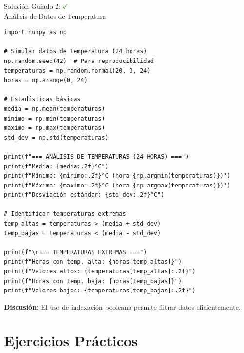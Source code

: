 \documentclass[10pt]{beamer}
\begin{document}
\begin{solutionblock}
\begin{frame}[fragile]{Solución Guiado 2: \hfill \textcolor{green}{$\checkmark$} \\ Análisis de Datos de Temperatura}
\begin{verbatim}
import numpy as np

# Simular datos de temperatura (24 horas)
np.random.seed(42)  # Para reproducibilidad
temperaturas = np.random.normal(20, 3, 24)
horas = np.arange(0, 24)

# Estadísticas básicas
media = np.mean(temperaturas)
minimo = np.min(temperaturas)
maximo = np.max(temperaturas)
std_dev = np.std(temperaturas)

print(f"=== ANÁLISIS DE TEMPERATURAS (24 HORAS) ===")
print(f"Media: {media:.2f}°C")
print(f"Mínimo: {minimo:.2f}°C (hora {np.argmin(temperaturas)})")
print(f"Máximo: {maximo:.2f}°C (hora {np.argmax(temperaturas)})")
print(f"Desviación estándar: {std_dev:.2f}°C")

# Identificar temperaturas extremas
temp_altas = temperaturas > (media + std_dev)
temp_bajas = temperaturas < (media - std_dev)

print(f"\n=== TEMPERATURAS EXTREMAS ===")
print(f"Horas con temp. alta: {horas[temp_altas]}")
print(f"Valores altos: {temperaturas[temp_altas]:.2f}")
print(f"Horas con temp. baja: {horas[temp_bajas]}")
print(f"Valores bajos: {temperaturas[temp_bajas]:.2f}")
\end{verbatim}
\textbf{Discusión:} El uso de indexación booleana permite filtrar datos eficientemente.
\end{frame}
\end{solutionblock}




\section{Ejercicios Prácticos}
\end{document}
